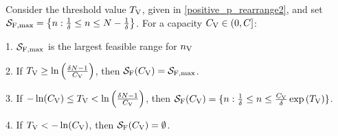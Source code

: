 \documentclass[12pt, draftclsnofoot, onecolumn]{IEEEtran}
\begin{document}
		\begin{lemma}\label{lemma3}
			Consider the threshold value $T_{\rm V}$, given in \eqref{positive_p_rearrange2}, and set $\mathcal{S}_{\rm F, max}= \left\{ n :  \frac{1}{\delta}  \leq n \leq  N-\frac{1}{\delta}  \right\}$. 
			For a capacity \( C_{\rm V} \in (0, C] \):
			
			
			1. $\mathcal{S}_{\rm F, max}$ is the largest feasible range for \( n_{\rm V} \)
			
			2. If $T_{\rm V} \geq \ln\left(\frac{\delta N - 1}{C_{\rm V}}\right)$,
			then  $\mathcal{S}_{\rm F}(C_{\rm V}) =\mathcal{S}_{\rm F, max}$.
			
			3. If $ -\ln({C_{\rm V}}) \leq T_{\rm V} < \ln\left(\frac{\delta N - 1}{C_{\rm V}}\right) $, then 
			\(\mathcal{S}_{\rm F}(C_{\rm V})=\{ n :   \frac{1}{\delta} \leq n \leq \frac{C_{\rm V}}{\delta}\exp\left(T_{\rm V}\right)   \}\).
			
			4. If $T_{\rm V} < -\ln(C_{\rm V})$,
			then 	$\mathcal{S}_{\rm F}(C_{\rm V}) = \emptyset$.
		\end{lemma}	
		
\end{document}
